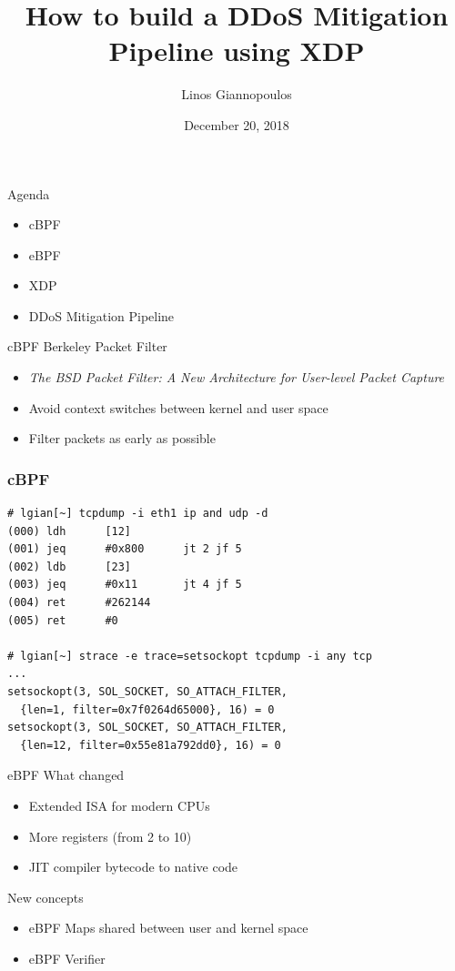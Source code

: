 \documentclass{beamer}
\title[XDP]{How to build a DDoS Mitigation Pipeline using XDP}
\author{Linos Giannopoulos}
\date{December 20, 2018}
\begin{document}
\begin{frame}
\titlepage
\end{frame}

\begin{frame}{Agenda}
  \begin{itemize}
    \item cBPF
    \item eBPF
    \item XDP
    \item DDoS Mitigation Pipeline
  \end{itemize}
\end{frame}

\begin{frame}{cBPF}
Berkeley Packet Filter
\begin{itemize}
\item \textit{The BSD Packet Filter: A New Architecture for User-level Packet Capture}
\item Avoid context switches between kernel and user space
\item Filter packets as early as possible
\end{itemize}
\end{frame}

\begin{frame}[fragile]
  \frametitle{cBPF}
  \begin{verbatim}
# lgian[~] tcpdump -i eth1 ip and udp -d
(000) ldh      [12]
(001) jeq      #0x800      jt 2 jf 5
(002) ldb      [23]
(003) jeq      #0x11       jt 4 jf 5
(004) ret      #262144
(005) ret      #0

# lgian[~] strace -e trace=setsockopt tcpdump -i any tcp
...
setsockopt(3, SOL_SOCKET, SO_ATTACH_FILTER,
  {len=1, filter=0x7f0264d65000}, 16) = 0
setsockopt(3, SOL_SOCKET, SO_ATTACH_FILTER,
  {len=12, filter=0x55e81a792dd0}, 16) = 0
  \end{verbatim}
\end{frame}

\begin{frame}{eBPF}
  What changed
  \begin{itemize}
    \item Extended ISA for modern CPUs
    \item More registers (from 2 to 10)
    \item JIT compiler bytecode to native code
  \end{itemize}

  New concepts
  \begin{itemize}
    \item eBPF Maps shared between user and kernel space
    \item eBPF Verifier
  \end{itemize}
\end{frame}
\end{document}
